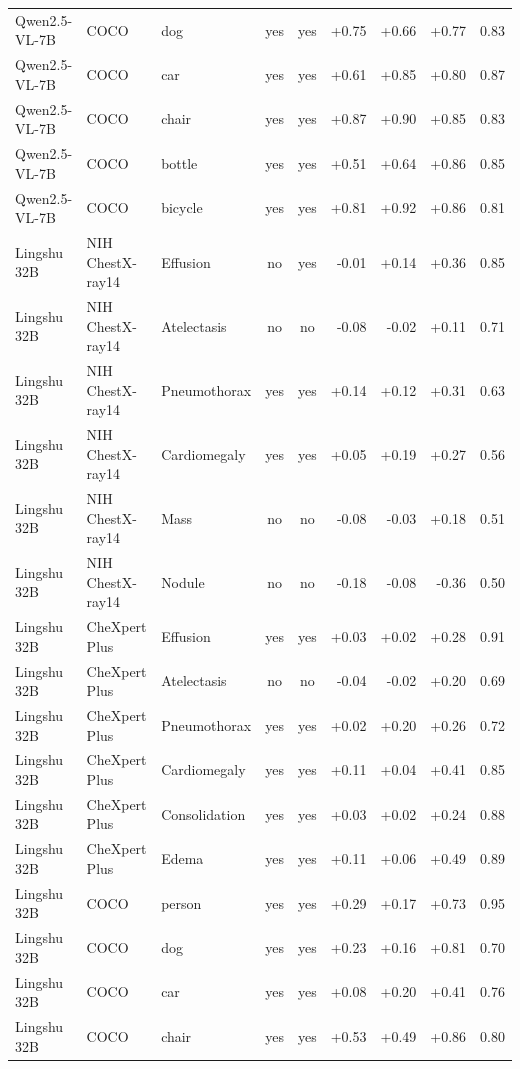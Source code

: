 \begin{table}[p]
\begin{tabular}{lllccrrrr}
Qwen2.5-VL-7B & COCO & dog & yes & yes & +0.75 & +0.66 & +0.77 & 0.83 \\
Qwen2.5-VL-7B & COCO & car & yes & yes & +0.61 & +0.85 & +0.80 & 0.87 \\
Qwen2.5-VL-7B & COCO & chair & yes & yes & +0.87 & +0.90 & +0.85 & 0.83 \\
Qwen2.5-VL-7B & COCO & bottle & yes & yes & +0.51 & +0.64 & +0.86 & 0.85 \\
Qwen2.5-VL-7B & COCO & bicycle & yes & yes & +0.81 & +0.92 & +0.86 & 0.81 \\
\addlinespace[2pt]
Lingshu 32B & NIH ChestX-ray14 & Effusion & no & yes & -0.01 & +0.14 & +0.36 & 0.85 \\
Lingshu 32B & NIH ChestX-ray14 & Atelectasis & no & no & -0.08 & -0.02 & +0.11 & 0.71 \\
Lingshu 32B & NIH ChestX-ray14 & Pneumothorax & yes & yes & +0.14 & +0.12 & +0.31 & 0.63 \\
Lingshu 32B & NIH ChestX-ray14 & Cardiomegaly & yes & yes & +0.05 & +0.19 & +0.27 & 0.56 \\
Lingshu 32B & NIH ChestX-ray14 & Mass & no & no & -0.08 & -0.03 & +0.18 & 0.51 \\
Lingshu 32B & NIH ChestX-ray14 & Nodule & no & no & -0.18 & -0.08 & -0.36 & 0.50 \\
\addlinespace[2pt]
Lingshu 32B & CheXpert Plus & Effusion & yes & yes & +0.03 & +0.02 & +0.28 & 0.91 \\
Lingshu 32B & CheXpert Plus & Atelectasis & no & no & -0.04 & -0.02 & +0.20 & 0.69 \\
Lingshu 32B & CheXpert Plus & Pneumothorax & yes & yes & +0.02 & +0.20 & +0.26 & 0.72 \\
Lingshu 32B & CheXpert Plus & Cardiomegaly & yes & yes & +0.11 & +0.04 & +0.41 & 0.85 \\
Lingshu 32B & CheXpert Plus & Consolidation & yes & yes & +0.03 & +0.02 & +0.24 & 0.88 \\
Lingshu 32B & CheXpert Plus & Edema & yes & yes & +0.11 & +0.06 & +0.49 & 0.89 \\
\addlinespace[2pt]
Lingshu 32B & COCO & person & yes & yes & +0.29 & +0.17 & +0.73 & 0.95 \\
Lingshu 32B & COCO & dog & yes & yes & +0.23 & +0.16 & +0.81 & 0.70 \\
Lingshu 32B & COCO & car & yes & yes & +0.08 & +0.20 & +0.41 & 0.76 \\
Lingshu 32B & COCO & chair & yes & yes & +0.53 & +0.49 & +0.86 & 0.80 \\

\end{tabular}
\end{table}
